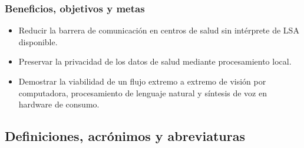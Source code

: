 \subsubsection{Beneficios, objetivos y metas}
\begin{itemize}
    \item Reducir la barrera de comunicación en centros de salud sin
    intérprete de LSA disponible.
    \item Preservar la privacidad de los datos de salud mediante
    procesamiento local.
    \item Demostrar la viabilidad de un flujo extremo a extremo de visión
    por computadora, procesamiento de lenguaje natural y síntesis de voz
    en hardware de consumo.
\end{itemize}

\subsection{Definiciones, acrónimos y abreviaturas}

